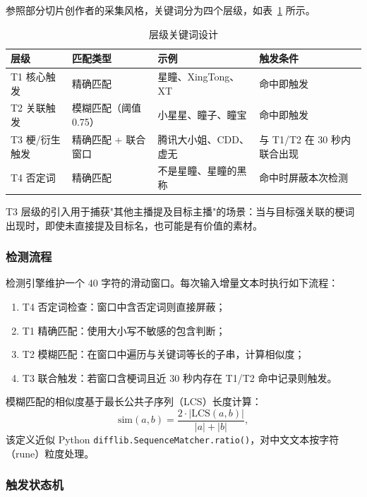 \documentclass[UTF8,11pt,a4paper]{ctexart}
\begin{document}
参照部分切片创作者的采集风格，关键词分为四个层级，如表~\ref{tab:tiers} 所示。

\begin{table}[htbp]
\centering\small
\caption{层级关键词设计}
\label{tab:tiers}
\begin{tabular}{@{}llll@{}}
\toprule
层级 & 匹配类型 & 示例 & 触发条件 \\
\midrule
T1 核心触发 & 精确匹配 & 星瞳、XingTong、XT & 命中即触发 \\
T2 关联触发 & 模糊匹配（阈值 0.75） & 小星星、瞳子、瞳宝 & 命中即触发 \\
T3 梗/衍生触发 & 精确匹配 + 联合窗口 & 腾讯大小姐、CDD、虚无 & 与 T1/T2 在 30 秒内联合出现 \\
T4 否定词 & 精确匹配 & 不是星瞳、星瞳的黑称 & 命中时屏蔽本次检测 \\
\bottomrule
\end{tabular}
\end{table}

T3 层级的引入用于捕获"其他主播提及目标主播"的场景：当与目标强关联的梗词出现时，即使未直接提及目标名，也可能是有价值的素材。

\subsubsection{检测流程}

检测引擎维护一个 40 字符的滑动窗口。每次输入增量文本时执行如下流程：

\begin{enumerate}
\item T4 否定词检查：窗口中含否定词则直接屏蔽；
\item T1 精确匹配：使用大小写不敏感的包含判断；
\item T2 模糊匹配：在窗口中遍历与关键词等长的子串，计算相似度；
\item T3 联合触发：若窗口含梗词且近 30 秒内存在 T1/T2 命中记录则触发。
\end{enumerate}

模糊匹配的相似度基于最长公共子序列（LCS）长度计算：
\begin{equation}
\mathrm{sim}(a,b)=\frac{2\cdot |\mathrm{LCS}(a,b)|}{|a|+|b|},
\end{equation}
该定义近似 Python \texttt{difflib.SequenceMatcher.ratio()}，对中文文本按字符（rune）粒度处理。

\subsubsection{触发状态机}
\end{document}
